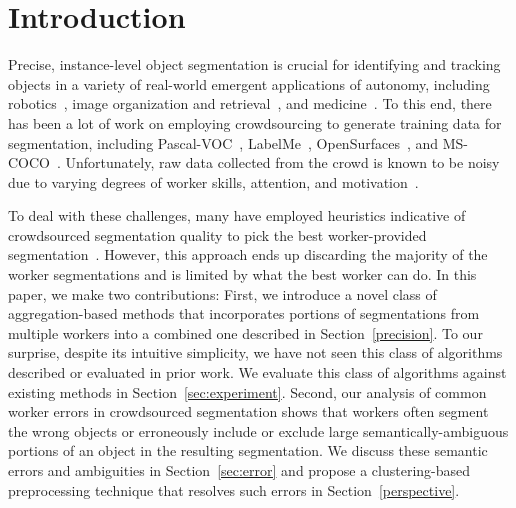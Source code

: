 \documentclass[letterpaper]{article}
\begin{document}
\section{Introduction\label{sec:intro}}
Precise, instance-level object segmentation is crucial for identifying and tracking objects in a variety of real-world emergent applications of autonomy, including robotics~\cite{Natonek1998}, image organization and retrieval~\cite{Yamaguchi2012}, and medicine~\cite{Irshad2014}. To this end, there has been a lot of work on employing crowdsourcing to generate training data for segmentation, including Pascal-VOC~\cite{Everingham15}, LabelMe~\cite{Torralba2010}, OpenSurfaces~\cite{bell15minc}, and MS-COCO~\cite{Lin2012}. Unfortunately, raw data collected from the crowd is known to be noisy due to varying degrees of worker skills, attention, and motivation~\cite{bell14intrinsic,MDWWelinder2010}. 
\par To deal with these challenges, many have employed heuristics indicative of crowdsourced segmentation quality to pick the best worker-provided segmentation~\cite{Sorokin2008,Vittayakorn2011}. However, this approach ends up discarding the majority of the worker segmentations and is limited by what the best worker can do. In this paper, we make two contributions: First, we introduce a novel class of aggregation-based methods that incorporates portions of segmentations from multiple workers into a combined one described in Section~\ref{precision}. To our surprise, despite its intuitive simplicity, we have not seen this class of algorithms described or evaluated in prior work. We evaluate this class of algorithms against existing methods in Section~\ref{sec:experiment}. Second, our analysis of common worker errors in crowdsourced segmentation shows that workers often segment the wrong objects or erroneously include or exclude large semantically-ambiguous portions of an object in the resulting segmentation. We discuss these semantic errors and ambiguities in Section~\ref{sec:error} and propose a clustering-based preprocessing technique that resolves such errors in Section~\ref{perspective}.%


\end{document}
